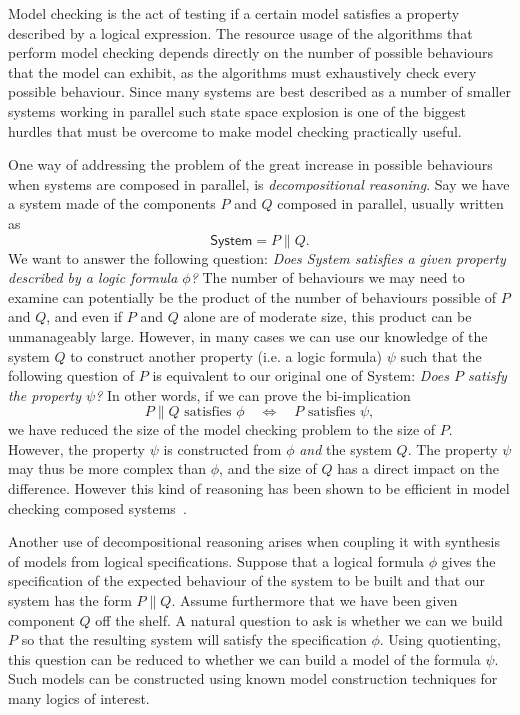 Model checking is the act of testing if a certain model satisfies a property
described by a logical expression. The resource usage of the algorithms that perform
model checking depends directly on the number of possible behaviours that the
model can exhibit, as the algorithms must exhaustively check every possible
behaviour. Since many systems are best described as a number of smaller systems
working in parallel such state space explosion is one of the biggest hurdles that
must be overcome to make model checking practically useful.

One way of addressing the problem of the great increase in possible behaviours
when systems are composed in parallel, is \emph{decompositional reasoning}. Say
we have a system made of the components $P$ and $Q$ composed in parallel, 
usually written as
\[
    \textsf{System} = P \parallel Q.
\]
We want to answer the following question: 
\emph{Does \textsf{System} satisfies a given property described by a
logic formula $\phi$?} 
The number of behaviours we may need to
examine can potentially be the product of the number of behaviours possible of $P$ and $Q$,
and even if $P$ and $Q$ alone are of moderate size, this product can be unmanageably large.
However, in many cases we can use our knowledge of the system $Q$ to construct
another property (i.e. a logic formula) $\psi$ such that the following question
of $P$
is equivalent to our original one of \textsf{System}:
\emph{Does $P$ satisfy the property $\psi$?} In other words, if we can prove the
bi-implication
\[
    P\parallel Q \textrm{ satisfies } \phi \quad\Leftrightarrow\quad
    P \textrm{ satisfies } \psi,
\]
we have reduced the size of the model checking problem to the size of $P$.
%
However, the property $\psi$ is constructed from $\phi$ \emph{and} the system $Q$.
The property $\psi$ may thus be more complex than $\phi$, and the size of $Q$ has
a direct impact on the difference. However this kind of reasoning has been shown
to be efficient in model checking composed systems~\cite{Andersen95,LaroussinieL98}.

Another use of decompositional reasoning arises when coupling it with synthesis 
of models from logical specifications. Suppose that a logical formula $\phi$ gives 
the specification of the expected behaviour of the system to be built and that 
our system has the form $P \parallel Q$. Assume furthermore that we have been given 
component $Q$ off the shelf. A natural question to ask is whether we can we build 
$P$ so that the resulting system will satisfy the specification $\phi$. Using 
quotienting, this question can be reduced to whether we can build a model of the
formula $\psi$. Such models can be constructed using known model construction 
techniques for many logics of interest. 


